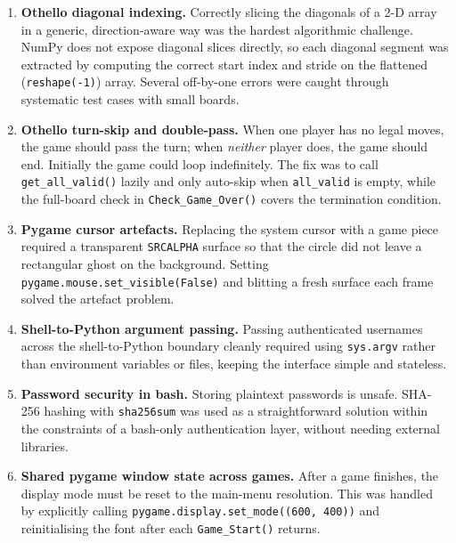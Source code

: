 \documentclass[12pt]{article}
\begin{document}
\begin{enumerate}
    \item \textbf{Othello diagonal indexing.}
    Correctly slicing the diagonals of a 2-D array in a generic, direction-aware way was the hardest algorithmic challenge. NumPy does not expose diagonal slices directly, so each diagonal segment was extracted by computing the correct start index and stride on the flattened (\texttt{reshape(-1)}) array. Several off-by-one errors were caught through systematic test cases with small boards.

    \item \textbf{Othello turn-skip and double-pass.}
    When one player has no legal moves, the game should pass the turn; when \emph{neither} player does, the game should end. Initially the game could loop indefinitely. The fix was to call \texttt{get\_all\_valid()} lazily and only auto-skip when \texttt{all\_valid} is empty, while the full-board check in \texttt{Check\_Game\_Over()} covers the termination condition.

    \item \textbf{Pygame cursor artefacts.}
    Replacing the system cursor with a game piece required a transparent \texttt{SRCALPHA} surface so that the circle did not leave a rectangular ghost on the background. Setting \texttt{pygame.mouse.set\_visible(False)} and blitting a fresh surface each frame solved the artefact problem.

    \item \textbf{Shell-to-Python argument passing.}
    Passing authenticated usernames across the shell-to-Python boundary cleanly required using \texttt{sys.argv} rather than environment variables or files, keeping the interface simple and stateless.

    \item \textbf{Password security in bash.}
    Storing plaintext passwords is unsafe. SHA-256 hashing with \texttt{sha256sum} was used as a straightforward solution within the constraints of a bash-only authentication layer, without needing external libraries.

    \item \textbf{Shared pygame window state across games.}
    After a game finishes, the display mode must be reset to the main-menu resolution. This was handled by explicitly calling \texttt{pygame.display.set\_mode((600, 400))} and reinitialising the font after each \texttt{Game\_Start()} returns.
\end{enumerate}
\end{document}
